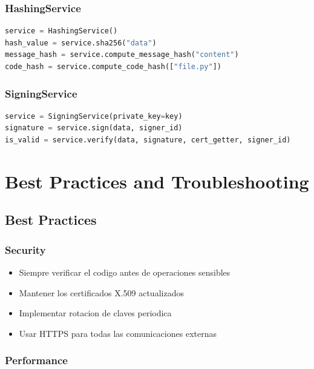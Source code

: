 \documentclass[12pt,a4paper]{report}
\begin{document}
\subsection{HashingService}

\begin{lstlisting}[language=python, caption={HashingService}]
service = HashingService()
hash_value = service.sha256("data")
message_hash = service.compute_message_hash("content")
code_hash = service.compute_code_hash(["file.py"])
\end{lstlisting}

\subsection{SigningService}

\begin{lstlisting}[language=python, caption={SigningService}]
service = SigningService(private_key=key)
signature = service.sign(data, signer_id)
is_valid = service.verify(data, signature, cert_getter, signer_id)
\end{lstlisting}

\cleardoublepage

\chapter{Best Practices and Troubleshooting}
\cleardoublepage

\section{Best Practices}

\subsection{Security}

\begin{itemize}
    \item Siempre verificar el codigo antes de operaciones sensibles
    \item Mantener los certificados X.509 actualizados
    \item Implementar rotacion de claves periodica
    \item Usar HTTPS para todas las comunicaciones externas
\end{itemize}

\subsection{Performance}
\end{document}
